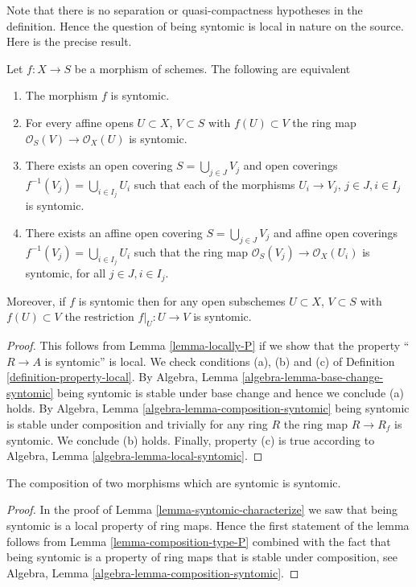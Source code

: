\medskip\noindent
Note that there is no separation or quasi-compactness hypotheses in the
definition. Hence the question of being syntomic is local in nature on
the source. Here is the precise result.

\begin{lemma}
\label{lemma-syntomic-characterize}
Let $f : X \to S$ be a morphism of schemes.
The following are equivalent
\begin{enumerate}
\item The morphism $f$ is syntomic.
\item For every affine opens $U \subset X$, $V \subset S$
with $f(U) \subset V$ the ring map
$\mathcal{O}_S(V) \to \mathcal{O}_X(U)$ is syntomic.
\item There exists an open covering $S = \bigcup_{j \in J} V_j$
and open coverings $f^{-1}(V_j) = \bigcup_{i \in I_j} U_i$ such
that each of the morphisms $U_i \to V_j$, $j\in J, i\in I_j$
is syntomic.
\item There exists an affine open covering $S = \bigcup_{j \in J} V_j$
and affine open coverings $f^{-1}(V_j) = \bigcup_{i \in I_j} U_i$ such
that the ring map $\mathcal{O}_S(V_j) \to \mathcal{O}_X(U_i)$ is
syntomic, for all $j\in J, i\in I_j$.
\end{enumerate}
Moreover, if $f$ is syntomic then for
any open subschemes $U \subset X$, $V \subset S$ with $f(U) \subset V$
the restriction $f|_U : U \to V$ is syntomic.
\end{lemma}

\begin{proof}
This follows from Lemma \ref{lemma-locally-P} if we show that
the property ``$R \to A$ is syntomic'' is local.
We check conditions (a), (b) and (c) of Definition
\ref{definition-property-local}.
By Algebra, Lemma \ref{algebra-lemma-base-change-syntomic}
being syntomic is stable under base change and hence
we conclude (a) holds. By
Algebra, Lemma \ref{algebra-lemma-composition-syntomic}
being syntomic is stable under composition and trivially for any ring
$R$ the ring map $R \to R_f$ is syntomic.
We conclude (b) holds. Finally, property (c) is true
according to Algebra, Lemma \ref{algebra-lemma-local-syntomic}.
\end{proof}

\begin{lemma}
\label{lemma-composition-syntomic}
The composition of two morphisms which are syntomic is syntomic.
\end{lemma}

\begin{proof}
In the proof of Lemma \ref{lemma-syntomic-characterize}
we saw that being syntomic is a local property of ring maps.
Hence the first statement of the lemma follows from
Lemma \ref{lemma-composition-type-P} combined
with the fact that being syntomic is a property of ring maps that is
stable under composition, see
Algebra, Lemma \ref{algebra-lemma-composition-syntomic}.
\end{proof}

